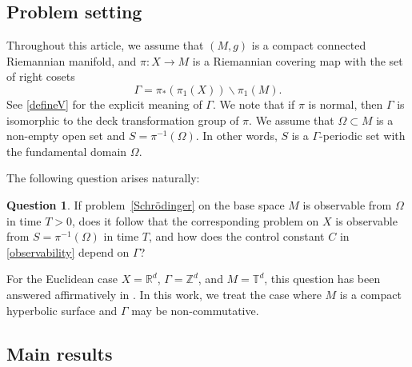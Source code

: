 \documentclass[11pt,oneside,reqno]{amsart}
\theoremstyle{definition}
\newtheorem{question}[definition]{Question}
\numberwithin{equation}{section}
\theoremstyle{plain}
\begin{document}
\subsection{Problem setting}

Throughout this article, we assume that $(M,g)$ is a compact connected Riemannian manifold, and $\pi: X \rightarrow M$ is a Riemannian covering map with the set of right cosets
\begin{equation*}
    \Gamma = \pi_{*}(\pi_1(X)) \backslash \pi_1(M).
\end{equation*}
See \eqref{defineV} for the explicit meaning of $\Gamma$. We note that if $\pi$ is normal, then $\Gamma$ is isomorphic to the deck transformation group of $\pi$. We assume that $\Omega \subset M$ is a non-empty open set and $S = \pi^{-1}(\Omega)$. In other words, $S$ is a $\Gamma$-periodic set with the fundamental domain $\Omega$.


The following question arises naturally:

\begin{question}\label{question}
If problem~\eqref{Schrödinger} on the base space $M$ is observable from $\Omega$ in time $T>0$, does it follow that the corresponding problem on $X$ is observable from $S=\pi^{-1}(\Omega)$ in time $T$, and how does the control constant $C$ in \eqref{observability} depend on $\Gamma$?
\end{question}

For the Euclidean case $X= \mathbb{R}^d$, $\Gamma = \mathbb{Z}^d$, and $M= \mathbb{T}^d$, this question has been answered affirmatively in \cite{wunsch2017periodic, taufer2023controllability, balch2023obs}. In this work, we treat the case where $M$ is a compact hyperbolic surface and $\Gamma$ may be non-commutative.


\subsection{Main results}


\end{document}
